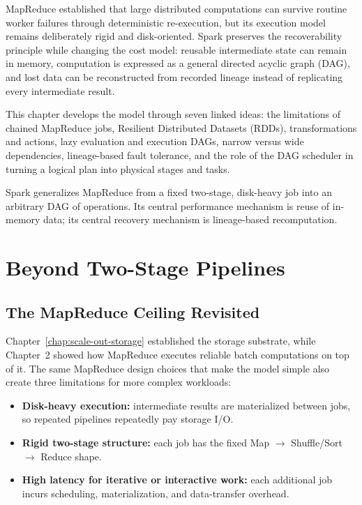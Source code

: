 \documentclass[11pt,a4paper,oneside]{book}
\begin{document}
MapReduce established that large distributed computations can survive routine worker failures through deterministic re-execution, but its execution model remains deliberately rigid and disk-oriented. Spark preserves the recoverability principle while changing the cost model: reusable intermediate state can remain in memory, computation is expressed as a general directed acyclic graph (DAG), and lost data can be reconstructed from recorded lineage instead of replicating every intermediate result.

This chapter develops the model through seven linked ideas: the limitations of chained MapReduce jobs, Resilient Distributed Datasets (RDDs), transformations and actions, lazy evaluation and execution DAGs, narrow versus wide dependencies, lineage-based fault tolerance, and the role of the DAG scheduler in turning a logical plan into physical stages and tasks.

\begin{keyconcept}
Spark generalizes MapReduce from a fixed two-stage, disk-heavy job into an arbitrary DAG of operations. Its central performance mechanism is reuse of in-memory data; its central recovery mechanism is lineage-based recomputation.
\end{keyconcept}

\section{Beyond Two-Stage Pipelines}
\label{sec:spark-beyond-mapreduce}

\subsection{The MapReduce Ceiling Revisited}

Chapter~\ref{chap:scale-out-storage} established the storage substrate, while Chapter~2 showed how MapReduce executes reliable batch computations on top of it. The same MapReduce design choices that make the model simple also create three limitations for more complex workloads:

\begin{itemize}
    \item \textbf{Disk-heavy execution:} intermediate results are materialized between jobs, so repeated pipelines repeatedly pay storage I/O.
    \item \textbf{Rigid two-stage structure:} each job has the fixed Map $\rightarrow$ Shuffle/Sort $\rightarrow$ Reduce shape.
    \item \textbf{High latency for iterative or interactive work:} each additional job incurs scheduling, materialization, and data-transfer overhead.
\end{itemize}
\end{document}

